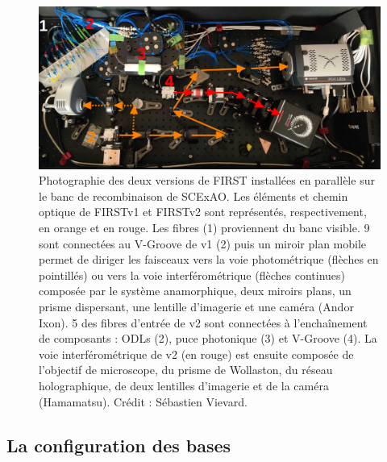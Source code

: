 \begin{figure}[ht!]
    \centering
    \includegraphics[width=\figwidth]{Figure_Chap5/20220601_SCExAO_FIRSTRecombBench_V1_V2_Photo_label.png}
    \caption[Photographie des deux versions de FIRST installées en parallèle sur le banc de recombinaison de SCExAO.]{Photographie des deux versions de FIRST installées en parallèle sur le banc de recombinaison de SCExAO. Les éléments et chemin optique de FIRSTv1 et FIRSTv2 sont représentés, respectivement, en orange et en rouge. Les fibres (1) proviennent du banc visible. 9 sont connectées au V-Groove de v1 (2) puis un miroir plan mobile permet de diriger les faisceaux vers la voie photométrique (flèches en pointillés) ou vers la voie interférométrique (flèches continues) composée par le système anamorphique, deux miroirs plans, un prisme dispersant, une lentille d'imagerie et une caméra (Andor Ixon). 5 des fibres d'entrée de v2 sont connectées à l'enchaînement de composants : ODLs (2), puce photonique (3) et V-Groove (4). La voie interférométrique de v2 (en rouge) est ensuite composée de l'objectif de microscope, du prisme de Wollaston, du réseau holographique, de deux lentilles d'imagerie et de la caméra (Hamamatsu). Crédit : Sébastien Vievard.}
    \label{fig:FIRSTV1V2FinalPhoto}
\end{figure}


\subsection{La configuration des bases}

